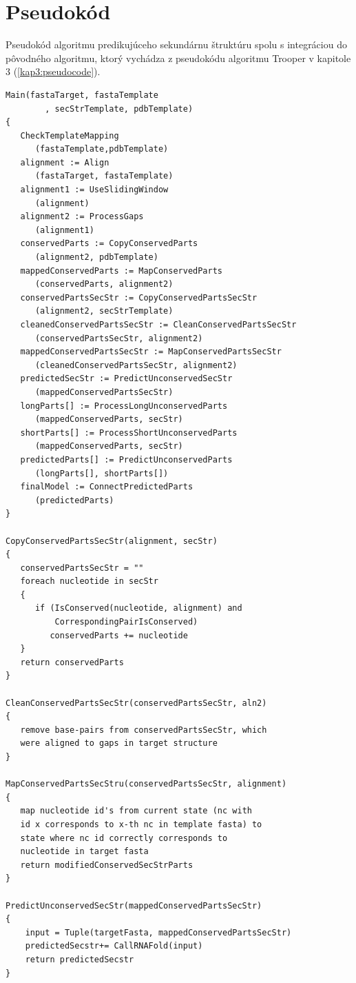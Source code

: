 \section{Pseudokód}\label{kap5:pseudocode}
 Pseudokód algoritmu predikujúceho sekundárnu štruktúru spolu s integráciou do pôvodného algoritmu, ktorý vychádza z pseudokódu algoritmu Trooper v kapitole 3 (\autoref{kap3:pseudocode}).
\lstset{numbers=left, numberstyle=\tiny, stepnumber=1, numbersep=5pt}
\begin{lstlisting}
Main(fastaTarget, fastaTemplate
        , secStrTemplate, pdbTemplate)
{
   CheckTemplateMapping
      (fastaTemplate,pdbTemplate)
   alignment := Align
      (fastaTarget, fastaTemplate)
   alignment1 := UseSlidingWindow
      (alignment)
   alignment2 := ProcessGaps
      (alignment1)
   conservedParts := CopyConservedParts
      (alignment2, pdbTemplate)
   mappedConservedParts := MapConservedParts
      (conservedParts, alignment2)
   conservedPartsSecStr := CopyConservedPartsSecStr
      (alignment2, secStrTemplate)
   cleanedConservedPartsSecStr := CleanConservedPartsSecStr
      (conservedPartsSecStr, alignment2)
   mappedConservedPartsSecStr := MapConservedPartsSecStr
      (cleanedConservedPartsSecStr, alignment2)
   predictedSecStr := PredictUnconservedSecStr
      (mappedConservedPartsSecStr)
   longParts[] := ProcessLongUnconservedParts
      (mappedConservedParts, secStr)
   shortParts[] := ProcessShortUnconservedParts
      (mappedConservedParts, secStr)
   predictedParts[] := PredictUnconservedParts
      (longParts[], shortParts[])
   finalModel := ConnectPredictedParts
      (predictedParts)
}

CopyConservedPartsSecStr(alignment, secStr)
{
   conservedPartsSecStr = ""
   foreach nucleotide in secStr 
   {
      if (IsConserved(nucleotide, alignment) and
          CorrespondingPairIsConserved)
         conservedParts += nucleotide
   }
   return conservedParts
}

CleanConservedPartsSecStr(conservedPartsSecStr, aln2)
{
   remove base-pairs from conservedPartsSecStr, which 
   were aligned to gaps in target structure
}

MapConservedPartsSecStru(conservedPartsSecStr, alignment)
{
   map nucleotide id's from current state (nc with
   id x corresponds to x-th nc in template fasta) to 
   state where nc id correctly corresponds to 
   nucleotide in target fasta 
   return modifiedConservedSecStrParts
}

PredictUnconservedSecStr(mappedConservedPartsSecStr)
{
    input = Tuple(targetFasta, mappedConservedPartsSecStr)
    predictedSecstr+= CallRNAFold(input)
    return predictedSecstr
}


\end{lstlisting}
